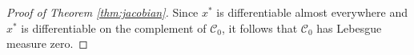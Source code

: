 \documentclass[a4paper,11pt]{article}
\begin{document}
\begin{proof}[Proof of Theorem \ref{thm:jacobian}]
Since $x^*$ is differentiable almost everywhere and $x^*$ is differentiable on the complement of $\mathcal{C}_0$, it follows that $\mathcal{C}_0$ has Lebesgue measure zero.  


\end{proof}
\end{document}
